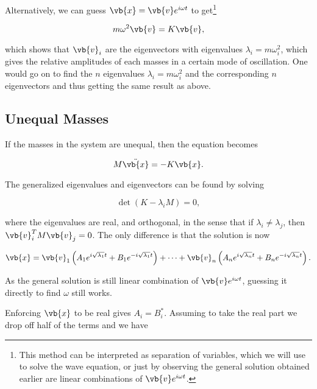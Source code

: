 \documentclass[a4paper,12pt]{report}
\begin{document}
Alternatively, we can guess \(\vb{x} = \vb{v} e^{i \omega t} \) to get\footnote{This method can be interpreted as separation of variables, which we will use to solve the wave equation, or just by observing the general solution obtained earlier are linear combinations of \(\vb{v} e^{i \omega t} \).} 

\begin{equation}
	m \omega ^2 \vb{v} = K \vb{v} ,
\end{equation}

which shows that \(\vb{v} _{i} \) are the eigenvectors with eigenvalues \(\lambda _{i} =  m \omega _{i}^2\), which gives the relative amplitudes of each masses in a certain mode of oscillation. One would go on to find the \(n\) eigenvalues \(\lambda _{i} = m \omega _{i}^2  \) and the corresponding \(n\) eigenvectors and thus getting the same result as above.

\subsection{Unequal Masses}

If the masses in the system are unequal, then the equation becomes 

\begin{equation}
    M \ddot{\vb{x} } = -K\vb{x}. \label{normal2} 
\end{equation}

The generalized eigenvalues and eigenvectors can be found by solving 

\begin{equation}
    \det (K-\lambda _{i}M ) = 0,
\end{equation}

where the eigenvalues are real, and orthogonal, in the sense that if \(\lambda _{i} \neq \lambda _{j}  \), then \(\vb{v} _{i}^T M \vb{v} _{j}  =0\). The only difference is that the solution is now

\begin{equation}
	\vb{x} = \vb{v} _{1}\left(A_1 e^{i\sqrt{\lambda _{1}  } t} + B_1 e^{-i\sqrt{\lambda _{1}  } t}\right) + \cdots + \vb{v} _{n} \left(A_{n} e^{i\sqrt{\lambda _{n}  } t} + B_{n} e^{-i\sqrt{\lambda _{n}  } t}\right).
\end{equation}

As the general solution is still linear combination of \(\vb{v} e^{i \omega t} \), guessing it directly to find \(\omega \) still works.  

Enforcing \(\vb{x} \) to be real gives \(A_{i} = B_{i}^*  \). Assuming to take the real part we drop off half of the terms and we have 
\end{document}
